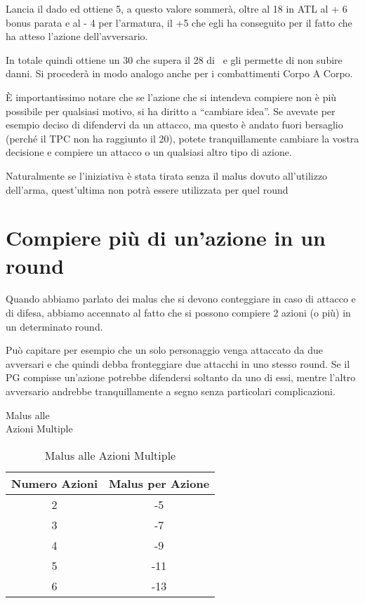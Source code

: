 {Lancia il dado ed ottiene 5, a questo valore sommer\`a, oltre al 18
in ATL al + 6 bonus parata e al - 4 per l'armatura, il +5 che egli
ha conseguito per il fatto che ha atteso l'azione dell'avversario.

In totale quindi ottiene un 30 che supera il 28 di \persA\ e gli
permette di non subire danni. Si proceder\`a in modo analogo anche
per i combattimenti Corpo A Corpo. 

\`E importantissimo notare che se l'azione che si intendeva compiere
non \`e pi\`u possibile per qualsiasi motivo, si ha diritto a
``cambiare idea''. Se avevate per esempio deciso di difendervi da un
attacco, ma questo \`e andato fuori bersaglio (perch\'e il TPC non
ha raggiunto il 20), potete tranquillamente cambiare la vostra
decisione e compiere un attacco o un qualsiasi altro tipo di azione.

Naturalmente se l'iniziativa \`e stata tirata senza il malus dovuto
all'utilizzo dell'arma, quest'ultima non potr\`a essere utilizzata
per quel round}

\iffullversion
{\sloppy\raggedright \section{Compiere pi\`u di un'azione in un round}}
\label{azionemultipla}

Quando abbiamo parlato dei malus che si devono conteggiare in caso di
attacco e di difesa, abbiamo accennato al fatto che si possono
compiere 2 azioni (o pi\`u) in un determinato round.

Pu\`o capitare per esempio che un solo personaggio venga attaccato
da due avversari e che quindi debba fronteggiare due attacchi in uno
stesso round. Se il PG compisse un'azione potrebbe difendersi
soltanto da uno di essi, mentre l'altro avversario andrebbe
tranquillamente a segno senza particolari complicazioni.

\begin{table}[b]
\begin{center}

  {\Large\sc Malus alle \\Azioni Multiple}\medskip
  
  \begin{tabular}{|c|c|}
    \hline
    Numero Azioni& Malus per Azione \\ \hline \hline
    2& -5 \\ \hline
    3& -7 \\ \hline
    4& -9 \\ \hline
    5& -11 \\ \hline
    6& -13 \\ \hline
  \end{tabular}
  \caption{Malus alle Azioni Multiple}
  \label{tabazionimultiple}
\end{center}
\end{table}

